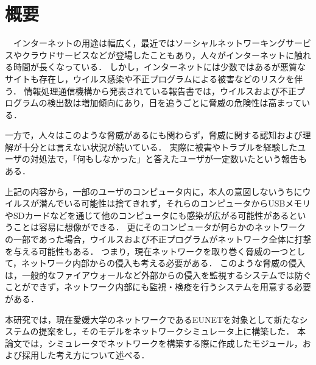 \chapter*{概要}

　インターネットの用途は幅広く，最近ではソーシャルネットワーキングサービスやクラウドサービスなどが登場したこともあり，人々がインターネットに触れる時間が長くなっている．
しかし，インターネットには少数ではあるが悪質なサイトも存在し，ウイルス感染や不正プログラムによる被害などのリスクを伴う．
情報処理通信機構から発表されている報告書では，ウイルスおよび不正プログラムの検出数は増加傾向にあり\cite{joron2}，日を追うごとに脅威の危険性は高まっている．

一方で，人々はこのような脅威があるにも関わらず，脅威に関する認知および理解が十分とは言えない状況が続いている．
実際に被害やトラブルを経験したユーザの対処法で，「何もしなかった」と答えたユーザが一定数いたという報告もある\cite{joron1}．

上記の内容から，一部のユーザのコンピュータ内に，本人の意図しないうちにウイルスが潜んでいる可能性は捨てきれず，それらのコンピュータからUSBメモリやSDカードなどを通じて他のコンピュータにも感染が広がる可能性があるということは容易に想像ができる．
更にそのコンピュータが何らかのネットワークの一部であった場合，ウイルスおよび不正プログラムがネットワーク全体に打撃を与える可能性もある．
つまり，現在ネットワークを取り巻く脅威の一つとして，ネットワーク内部からの侵入も考える必要がある．
このような脅威の侵入は，一般的なファイアウォールなど外部からの侵入を監視するシステムでは防ぐことができず，ネットワーク内部にも監視・検疫を行うシステムを用意する必要がある．

本研究では，現在愛媛大学のネットワークであるEUNETを対象として新たなシステムの提案をし，そのモデルをネットワークシミュレータ上に構築した．
本論文では，シミュレータでネットワークを構築する際に作成したモジュール，および採用した考え方について述べる．